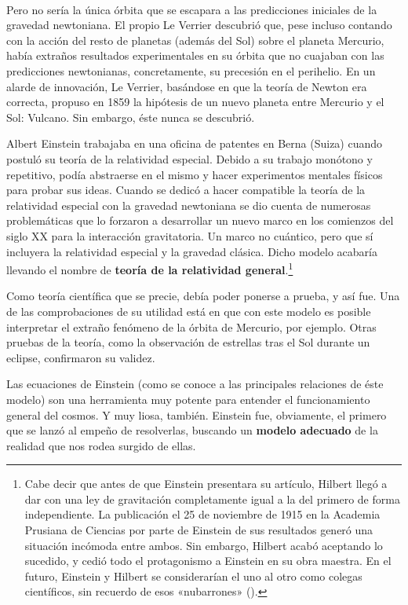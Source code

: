 \documentclass[11pt,a4paper,titlepage]{article}
\begin{document}
\\\par Pero no sería la única órbita que se escapara a las predicciones iniciales de la gravedad newtoniana. El propio Le Verrier descubrió que, pese incluso contando con la acción del resto de planetas (además del Sol) sobre el planeta Mercurio, había extraños resultados experimentales en su órbita que no cuajaban con las predicciones newtonianas, concretamente, su precesión en el perihelio. En un alarde de innovación, Le Verrier, basándose en que la teoría de Newton era correcta, propuso en 1859 la hipótesis de un nuevo planeta entre Mercurio y el Sol: Vulcano. Sin embargo, éste nunca se descubrió.
\\\par Albert Einstein trabajaba en una oficina de patentes en Berna (Suiza) cuando postuló su teoría de la relatividad especial. Debido a su trabajo monótono y repetitivo, podía abstraerse en el mismo y hacer experimentos mentales físicos para probar sus ideas. Cuando se dedicó a hacer compatible la teoría de la relatividad especial con la gravedad newtoniana se dio cuenta de numerosas problemáticas que lo forzaron a desarrollar un nuevo marco en los comienzos del siglo XX para la interacción gravitatoria. Un marco no cuántico, pero que sí incluyera la relatividad especial y la gravedad clásica. Dicho modelo acabaría llevando el nombre de \textbf{teoría de la relatividad general}.\footnote{Cabe decir que antes de que Einstein presentara su artículo, Hilbert llegó a dar con una ley de gravitación completamente igual a la del primero de forma independiente. La publicación el 25 de noviembre de 1915 en la Academia Prusiana de Ciencias por parte de Einstein de sus resultados generó una situación incómoda entre ambos. Sin embargo, Hilbert acabó aceptando lo sucedido, y cedió todo el protagonismo a Einstein en su obra maestra. En el futuro, Einstein y Hilbert se considerarían el uno al otro como colegas científicos, sin recuerdo de esos «nubarrones» (\cite[p.~49-50]{teoriaperfecta}).}
\par Como teoría científica que se precie, debía poder ponerse a prueba, y así fue. Una de las comprobaciones de su utilidad está en que con este modelo es posible interpretar el extraño fenómeno de la órbita de Mercurio, por ejemplo. Otras pruebas de la teoría, como la observación de estrellas tras el Sol durante un eclipse, confirmaron su validez.
\\\par Las ecuaciones de Einstein (como se conoce a las principales relaciones de éste modelo) son una herramienta muy potente para entender el funcionamiento general del cosmos. Y muy liosa, también. Einstein fue, obviamente, el primero que se lanzó al empeño de resolverlas, buscando un \textbf{modelo adecuado} de la realidad que nos rodea surgido de ellas.
\end{document}
